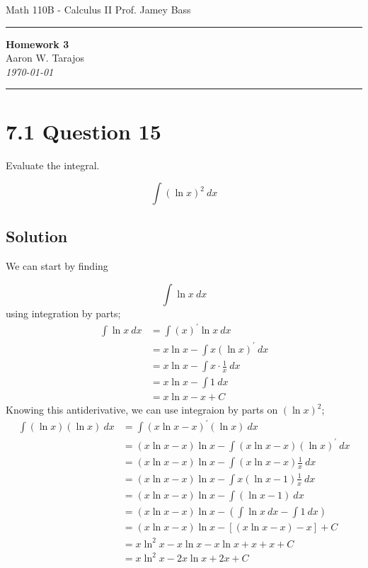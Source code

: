 \documentclass{article}
\begin{document}
\noindent
Math 110B - Calculus II  \hfill Prof. Jamey Bass

\noindent\rule{\textwidth}{0.4pt}

\begin{center}
    \textbf{\LARGE Homework 3} \\
    \vspace{12pt}
    \large Aaron W. Tarajos \\
    \textit{\today}
\end{center}

\noindent\rule{\textwidth}{0.4pt}

\section*{7.1 Question 15}
Evaluate the integral.

\[
	\int (\ln x)^2\ dx
\]

\subsection*{Solution}
We can start by finding

\[
	\int \ln x\ dx
\]
using integration by parts;
\begin{align*}
	\int \ln x\ dx &= \int \left( x \right)^\prime \ln x\ dx \\
		       &= x \ln x - \int x \left( \ln x \right)^\prime\ dx \\
		       &= x \ln x - \int x \cdot \frac{1}{x}\ dx \\
		       &= x \ln x - \int 1\ dx \\
		       &= x \ln x - x + C
\end{align*}
Knowing this antiderivative, we can use integraion by parts on $\left( \ln x \right)^2$;
\begin{align*}
	\int \left( \ln x\right) \left( \ln x \right)\ dx &= \int \left(x \ln x - x \right)^\prime \left(\ln x\right)\ dx \\
							  &= \left(x \ln x - x \right) \ln x - \int \left(x \ln x - x \right) \left(\ln x\right)^\prime\ dx \\
							  &= \left(x \ln x - x \right) \ln x - \int \left(x \ln x - x \right) \frac{1}{x}\ dx \\
							  &= \left(x \ln x - x \right) \ln x - \int x\left(\ln x - 1 \right) \frac{1}{x}\ dx \\
							  &= \left(x \ln x - x \right) \ln x - \int \left(\ln x - 1 \right)\ dx \\
							  &= \left(x \ln x - x \right) \ln x - \left(\int \ln x\ dx - \int 1\ dx \right)\\
							  &= \left(x \ln x - x \right) \ln x - \left[\left(x \ln x - x \right) - x \right] + C\\
							  &= x\ln^2x - x\ln x - x\ln x + x + x + C \\
							  &= \boxed{x\ln^2x - 2x\ln x + 2x + C}
\end{align*}
\end{document}
